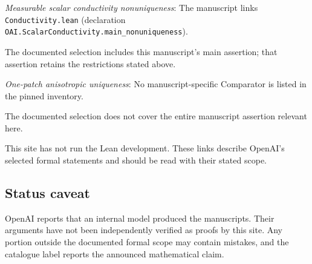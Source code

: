 \documentclass[11pt]{article}
\begin{document}
\textit{Measurable scalar conductivity nonuniqueness}: The manuscript links \texttt{Conductivity.lean} (declaration \texttt{OAI.ScalarConductivity.main\_nonuniqueness}).

The documented selection includes this manuscript’s main assertion; that assertion retains the restrictions stated above.

\textit{One-patch anisotropic uniqueness}: No manuscript-specific Comparator is listed in the pinned inventory.

The documented selection does not cover the entire manuscript assertion relevant here.

This site has not run the Lean development. These links describe OpenAI’s selected formal statements and should be read with their stated scope.

\subsection{Status caveat}
OpenAI reports that an internal model produced the manuscripts. Their arguments have not been independently verified as proofs by this site. Any portion outside the documented formal scope may contain mistakes, and the catalogue label reports the announced mathematical claim.
\end{document}
